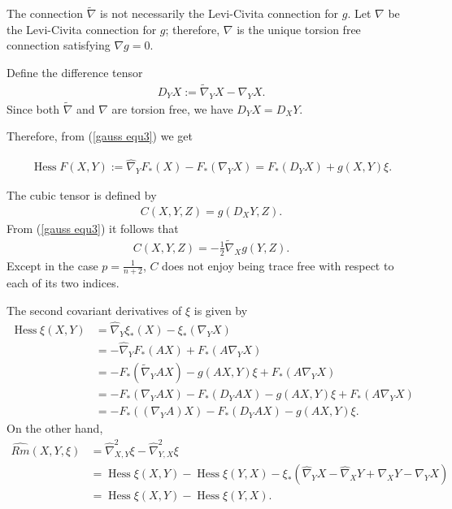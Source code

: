 \documentclass{amsart}
\theoremstyle{definition}
\theoremstyle{remark}
\numberwithin{equation}{section}
\begin{document}
The connection $\tilde{\nabla}$ is not necessarily the Levi-Civita connection for $g$. Let $\nabla$ be the Levi-Civita connection for $g$; therefore, $\nabla$ is the unique torsion free connection satisfying $\nabla g=0.$

Define the difference tensor
\begin{align*}
D_YX:=\tilde{\nabla}_{Y}X-\nabla_{Y}X.
\end{align*}
Since both $\tilde{\nabla}$ and $\nabla$ are torsion free, we have $D_YX=D_XY.$

Therefore, from (\ref{gauss equ3}) we get

\begin{align}\label{gauss equ3}
\operatorname{Hess}F(X,Y):=\hat{\nabla}_YF_{\ast}(X)-F_{\ast}(\nabla_YX)=F_{\ast}(D_YX)+g(X,Y)\xi.
\end{align}

The cubic tensor is defined by
\begin{align}
C(X,Y,Z)=g(D_XY,Z).
\end{align}
From (\ref{gauss equ3}) it follows that
\begin{align}
C(X,Y,Z)
=-\frac{1}{2}\tilde{\nabla}_Xg(Y,Z).
\end{align}
Except in the case $ p =\frac{1}{n+2}$, $ C$ does not enjoy being trace free with respect to each of its two indices.


The second covariant derivatives of $ \xi$ is given by
\begin{align}
\operatorname{Hess}\xi(X,Y)&=\hat{\nabla}_Y\xi_{\ast}(X)-\xi_{\ast}(\nabla_YX)\\
&=-\hat{\nabla}_YF_{\ast}(AX)+F_{\ast}(A\nabla_YX)\nonumber\\
&=-F_{\ast}(\tilde{\nabla}_{Y}AX)-g(A X,Y)\xi+F_{\ast}(A\nabla_YX)\nonumber\\
&=-F_{\ast}(\nabla_{Y}AX)-F_{\ast}(D_{Y}AX)-g(A X,Y)\xi+F_{\ast}(A\nabla_YX)\nonumber\\
&=-F_{\ast}((\nabla_Y A)X)-F_{\ast}(D_{Y}AX)-g(A X,Y)\xi.\nonumber
\end{align}
On the other hand,
\begin{align}
\widehat{Rm}(X,Y,\xi)&=\hat{\nabla}^2_{X,Y}\xi-\hat{\nabla}^2_{Y,X}\xi\\
&=\operatorname{Hess}\xi(X,Y)-\operatorname{Hess}\xi(Y,X)-\xi_{\ast}(\hat{\nabla}_YX-\hat{\nabla}_XY+\nabla_XY-\nabla_YX)\nonumber\\
&=\operatorname{Hess}\xi(X,Y)-\operatorname{Hess}\xi(Y,X).\nonumber
\end{align}
\end{document}
